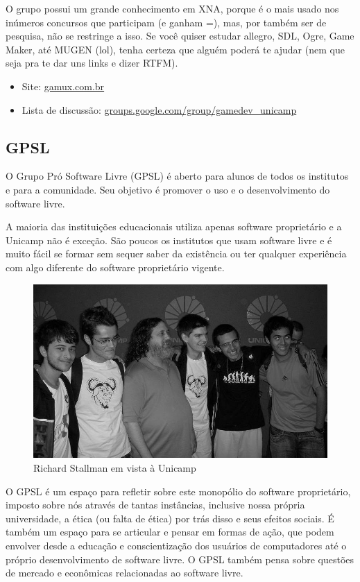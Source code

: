 O grupo possui um grande conhecimento em XNA, porque é o mais usado nos inúmeros
concursos que participam (e ganham =), mas, por também ser de pesquisa, não se
restringe a isso. Se você quiser estudar allegro, SDL, Ogre, Game Maker, até
MUGEN (lol), tenha certeza que alguém poderá te ajudar (nem que seja pra te dar
uns links e dizer RTFM).

\begin{itemize}
\item  Site: \url{gamux.com.br}
\item  Lista de discussão: \url{groups.google.com/group/gamedev_unicamp}
\end{itemize}

\subsection{GPSL}

O Grupo Pró Software Livre (GPSL) é aberto para alunos de todos os institutos
e para a comunidade. Seu objetivo é promover o uso e o desenvolvimento do
software livre.

A maioria das instituições educacionais utiliza apenas software
proprietário e a Unicamp não é exceção. São poucos os institutos que usam
software livre e é muito fácil se formar sem sequer saber da existência ou ter
qualquer experiência com algo diferente do software proprietário vigente.

\begin{figure}[h!]
    \centering
    \includegraphics[scale=0.36, keepaspectratio=true]{img/imgs/18-grupos_entidades/stallman2.JPG}
    \caption{Richard Stallman em vista à Unicamp}
\end{figure}
O GPSL é um espaço para refletir sobre este monopólio do software proprietário,
imposto sobre nós através de tantas instâncias, inclusive nossa própria
universidade, a ética (ou falta de ética) por trás disso e seus efeitos sociais.
É também um espaço para se articular e pensar em formas de ação, que podem
envolver desde a educação e conscientização dos usuários de computadores até
o próprio desenvolvimento de software livre. O GPSL também pensa sobre
questões de mercado e econômicas relacionadas ao software livre.

